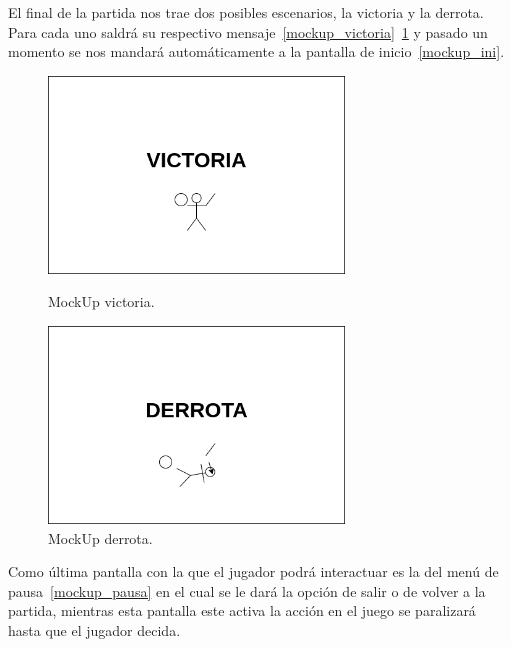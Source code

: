 El final de la partida nos trae dos posibles escenarios, la victoria y la derrota. 
Para cada uno saldrá su respectivo mensaje~\ref{mockup_victoria}~\ref{mockup_derrota}
y pasado un momento se nos mandará automáticamente a la pantalla de
inicio~\ref{mockup_ini}.

\begin{figure}[hb]
\centering
\begin{minipage}[c]{0.45\linewidth}
	\hspace{9mm}
	\includegraphics[width=0.7\textwidth]{imagenes/gdd/pantallas/Pantalla_victoria.png}
	\caption{MockUp victoria.}
	\label{mockup_victoria}
\end{minipage}
\begin{minipage}[c]{0.45\linewidth}
	\hspace{9mm}
	\includegraphics[width=0.7\textwidth]{imagenes/gdd/pantallas/Pantalla_derrota.png}
	\caption{MockUp derrota.}
	\label{mockup_derrota}
\end{minipage}	
\end{figure}

Como última pantalla con la que el jugador podrá interactuar es la del menú de
pausa~\ref{mockup_pausa} en el cual se le dará la opción de salir o de volver a la
partida, mientras esta pantalla este activa la acción en el juego se paralizará hasta
que el jugador decida. 

